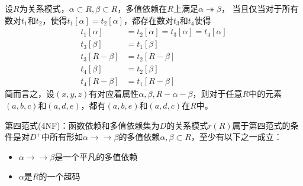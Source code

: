 \begin{definition}
设$R$为关系模式，$\alpha\subset R,\beta\subset R$，多值依赖在$R$上满足$\alpha\twoheadrightarrow\beta$，
当且仅当对于所有数对$t_1$和$t_2$，使得$t_1[\alpha]=t_2[\alpha]$，都存在数对$t_3$和$t_4$使得
\[\begin{aligned}
\displaystyle t_{1}[\alpha ]&= t_{2}[\alpha ]=t_{3}[\alpha ]=t_{4}[\alpha ]\\
\displaystyle t_{3}[\beta ]&= t_{1}[\beta ]\\
\displaystyle t_{3}[R-\beta ]&= t_{2}[R-\beta ]\\
\displaystyle t_{4}[\beta ]&= t_{2}[\beta ]\\
\displaystyle t_{4}[R-\beta ]&= t_{1}[R-\beta ]
\end{aligned}\]
简而言之，设${\displaystyle (x,y,z)}$有对应着属性${\displaystyle \alpha ,}{\displaystyle \beta ,}{\displaystyle R-\alpha -\beta }$，则对于任意$R$中的元素${\displaystyle (a,b,c)}$和${\displaystyle (a,d,e)}$，都有${\displaystyle (a,b,e)}$和${\displaystyle (a,d,c)}$在$R$中。
\end{definition}

第四范式(4NF)：函数依赖和多值依赖集为$D$的关系模式$r(R)$属于第四范式的条件是对$D^+$中所有形如$\alpha\to\to\beta$的多值依赖$\alpha,\beta\subset R$，至少有以下之一成立：
\begin{itemize}
	\item $\alpha\to\to\beta$是一个平凡的多值依赖
	\item $\alpha$是$R$的一个超码
\end{itemize}